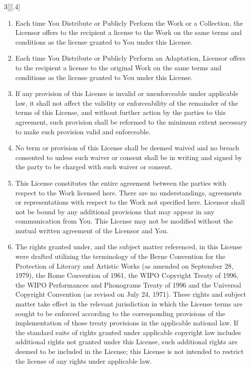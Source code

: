 \documentclass[8pt,a4paper]{article}
\begin{document}
\begin{multicols}{3}[][.4\paperwidth]
\begin{enumerate}
\begin{enumerate}
  \item Each time You Distribute or Publicly Perform the Work or a Collection,
        the Licensor offers to the recipient a license to the Work on the same
        terms and conditions as the license granted to You under this License.
  \item Each time You Distribute or Publicly Perform an Adaptation, Licensor
        offers to the recipient a license to the original Work on the same
        terms and conditions as the license granted to You under this License.
  \item If any provision of this License is invalid or unenforceable under
        applicable law, it shall not affect the validity or enforceability of
        the remainder of the terms of this License, and without further action
        by the parties to this agreement, such provision shall be reformed to
        the minimum extent necessary to make such provision valid and
        enforceable.
  \item No term or provision of this License shall be deemed waived and no
        breach consented to unless such waiver or consent shall be in writing
        and signed by the party to be charged with such waiver or consent.
  \item This License constitutes the entire agreement between the parties with
        respect to the Work licensed here. There are no understandings,
        agreements or representations with respect to the Work not specified
        here. Licensor shall not be bound by any additional provisions that
        may appear in any communication from You. This License may not be
        modified without the mutual written agreement of the Licensor and You.
  \item The rights granted under, and the subject matter referenced, in this
        License were drafted utilizing the terminology of the Berne Convention
        for the Protection of Literary and Artistic Works (as amended on
        September 28, 1979), the Rome Convention of 1961, the WIPO Copyright
        Treaty of 1996, the WIPO Performances and Phonograms Treaty of 1996
        and the Universal Copyright Convention (as revised on July 24, 1971).
        These rights and subject matter take effect in the relevant
        jurisdiction in which the License terms are sought to be enforced
        according to the corresponding provisions of the implementation of
        those treaty provisions in the applicable national law. If the
        standard suite of rights granted under applicable copyright law
        includes additional rights not granted under this License, such
        additional rights are deemed to be included in the License; this
        License is not intended to restrict the license of any rights under
        applicable law.


\end{enumerate}
\end{enumerate}
\end{multicols}
\end{document}
